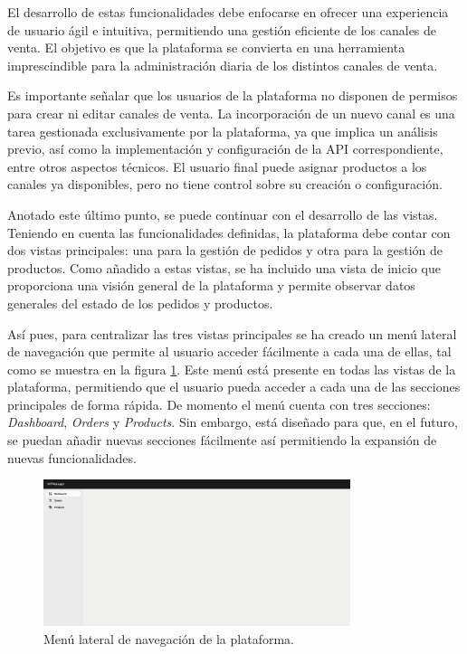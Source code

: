 El desarrollo de estas funcionalidades debe enfocarse en ofrecer una experiencia de usuario ágil e intuitiva, permitiendo una gestión eficiente de los canales de venta. El objetivo es que la plataforma se convierta en una herramienta imprescindible para la administración diaria de los distintos canales de venta.

Es importante señalar que los usuarios de la plataforma no disponen de permisos para crear ni editar canales de venta. La incorporación de un nuevo canal es una tarea gestionada exclusivamente por la plataforma, ya que implica un análisis previo, así como la implementación y configuración de la API correspondiente, entre otros aspectos técnicos. El usuario final puede asignar productos a los canales ya disponibles, pero no tiene control sobre su creación o configuración.

Anotado este último punto, se puede continuar con el desarrollo de las vistas. Teniendo en cuenta las funcionalidades definidas, la plataforma debe contar con dos vistas principales: una para la gestión de pedidos y otra para la gestión de productos. Como añadido a estas vistas, se ha incluido una vista de inicio que proporciona una visión general de la plataforma y permite observar datos generales del estado de los pedidos y productos.

Así pues, para centralizar las tres vistas principales se ha creado un menú lateral de navegación que permite al usuario acceder fácilmente a cada una de ellas, tal como se muestra en la figura \ref{fig:dev:ss:menu_lateral}. Este menú está presente en todas las vistas de la plataforma, permitiendo que el usuario pueda acceder a cada una de las secciones principales de forma rápida. De momento el menú cuenta con tres secciones: \textit{Dashboard}, \textit{Orders} y \textit{Products}. Sin embargo, está diseñado para que, en el futuro, se puedan añadir nuevas secciones fácilmente así permitiendo la expansión de nuevas funcionalidades.

\begin{figure}
    \centering
    \includegraphics[width=0.8\textwidth]{figures/design_develop/screenshots/menu_lateral.png}
    \caption{Menú lateral de navegación de la plataforma.}
    \label{fig:dev:ss:menu_lateral}
\end{figure}

